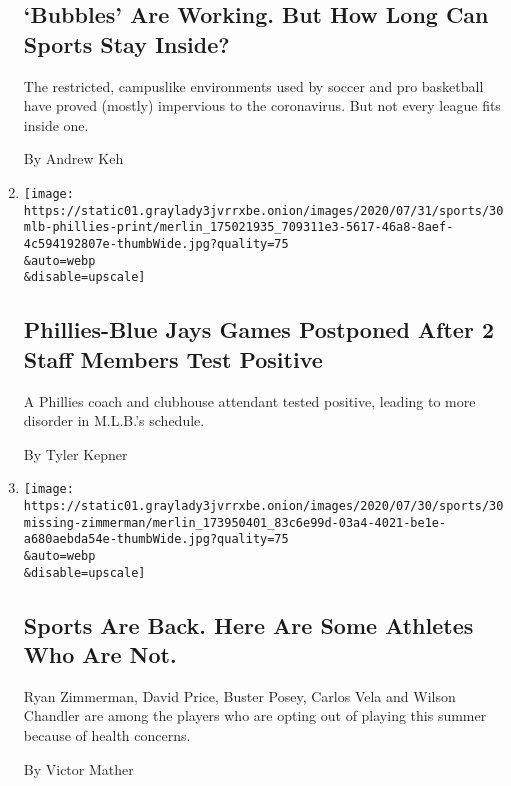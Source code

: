 \begin{enumerate}
  \hypertarget{bubbles-are-working-but-how-long-can-sports-stay-inside}{%
  \subsection{`Bubbles' Are Working. But How Long Can Sports Stay
  Inside?}\label{bubbles-are-working-but-how-long-can-sports-stay-inside}}

  The restricted, campuslike environments used by soccer and pro
  basketball have proved (mostly) impervious to the coronavirus. But not
  every league fits inside one.

  By Andrew Keh
\item
  \href{/2020/07/30/sports/baseball/phillies-blue-jays-postponed-coronavirus.html}{}

  \texttt{[image: https://static01.graylady3jvrrxbe.onion/images/2020/07/31/sports/30mlb-phillies-print/merlin\_175021935\_709311e3-5617-46a8-8aef-4c594192807e-thumbWide.jpg?quality=75\\\&auto=webp\\\&disable=upscale]}

  \hypertarget{phillies-blue-jays-games-postponed-after-2-staff-members-test-positive}{%
  \subsection{Phillies-Blue Jays Games Postponed After 2 Staff Members
  Test
  Positive}\label{phillies-blue-jays-games-postponed-after-2-staff-members-test-positive}}

  A Phillies coach and clubhouse attendant tested positive, leading to
  more disorder in M.L.B.'s schedule.

  By Tyler Kepner
\item
  \href{/2020/07/30/sports/players-opt-out.html}{}

  \texttt{[image: https://static01.graylady3jvrrxbe.onion/images/2020/07/30/sports/30missing-zimmerman/merlin\_173950401\_83c6e99d-03a4-4021-be1e-a680aebda54e-thumbWide.jpg?quality=75\\\&auto=webp\\\&disable=upscale]}

  \hypertarget{sports-are-back-here-are-some-athletes-who-are-not}{%
  \subsection{Sports Are Back. Here Are Some Athletes Who Are
  Not.}\label{sports-are-back-here-are-some-athletes-who-are-not}}

  Ryan Zimmerman, David Price, Buster Posey, Carlos Vela and Wilson
  Chandler are among the players who are opting out of playing this
  summer because of health concerns.

  By Victor Mather
\end{enumerate}

